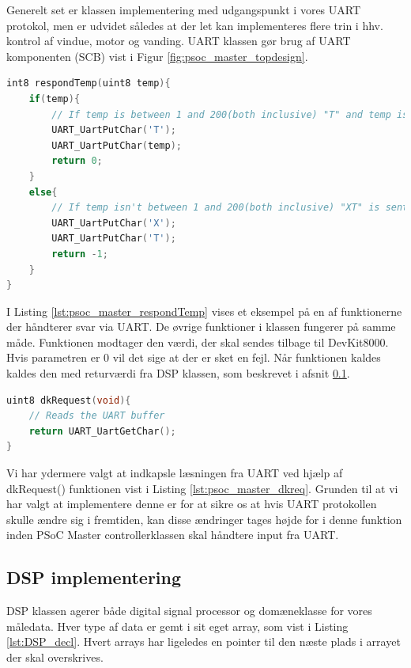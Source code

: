 Generelt set er klassen implementering med udgangspunkt i vores UART protokol, men er udvidet således at der let kan implementeres flere trin i hhv. kontrol af vindue, motor og vanding. UART klassen gør brug af UART komponenten (SCB) vist i Figur \ref{fig:psoc_master_topdesign}.

\begin{lstlisting}[language=C,caption=Implementering af respondTemp(),label=lst:psoc_master_respondTemp]
int8 respondTemp(uint8 temp){
    if(temp){
        // If temp is between 1 and 200(both inclusive) "T" and temp is sent to DevKit8000
        UART_UartPutChar('T');
        UART_UartPutChar(temp);
        return 0;
    }
    else{
        // If temp isn't between 1 and 200(both inclusive) "XT" is sent to DevKit8000
        UART_UartPutChar('X');
        UART_UartPutChar('T');
        return -1;
    }
}
\end{lstlisting}

I Listing \ref{lst:psoc_master_respondTemp} vises et eksempel på en af funktionerne der håndterer svar via UART. De øvrige funktioner i klassen fungerer på samme måde. Funktionen modtager den værdi, der skal sendes tilbage til DevKit8000. Hvis parametren er 0 vil det sige at der er sket en fejl. Når funktionen kaldes kaldes den med returværdi fra DSP klassen, som beskrevet i afsnit \ref{sec:DSP_impl}.

\begin{lstlisting}[language=C, caption=Implementering af dkRequest(), label=lst:psoc_master_dkreq]
uint8 dkRequest(void){
    // Reads the UART buffer
    return UART_UartGetChar();
}
\end{lstlisting}

Vi har ydermere valgt at indkapsle læsningen fra UART ved hjælp af dkRequest() funktionen vist i Listing \ref{lst:psoc_master_dkreq}. Grunden til at vi har valgt at implementere denne er for at sikre os at hvis UART protokollen skulle ændre sig i fremtiden, kan disse ændringer tages højde for i denne funktion inden PSoC Master controllerklassen skal håndtere input fra UART.

\subsection{DSP implementering}\label{sec:DSP_impl}
DSP klassen agerer både digital signal processor og domæneklasse for vores måledata. Hver type af data er gemt i sit eget array, som vist i Listing \ref{lst:DSP_decl}. Hvert arrays har ligeledes en pointer til den næste plads i arrayet der skal overskrives.

